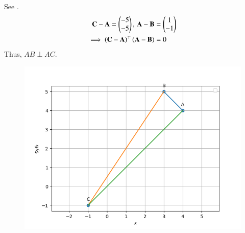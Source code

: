 		See .
\begin{align}
	\mathbf{C}-\mathbf{A}=\begin{pmatrix}
-5 \\
	-5\end{pmatrix},\,
	\mathbf{A}-\mathbf{B}&=\begin{pmatrix}
1 \\
-1 
\end{pmatrix}
\\
	\implies \left(\mathbf{C}-\mathbf{A}\right)^{\top}
	\left(\mathbf{A}-\mathbf{B}\right)&=0
\end{align}
Thus, $AB \perp AC$.
	\begin{figure}[!ht]
		\centering
 \includegraphics[width=\columnwidth]{chapters/11/10/1/6/figs/triangle.png}
		\caption{}
		\label{fig:11/10/1/6}
  	\end{figure}
